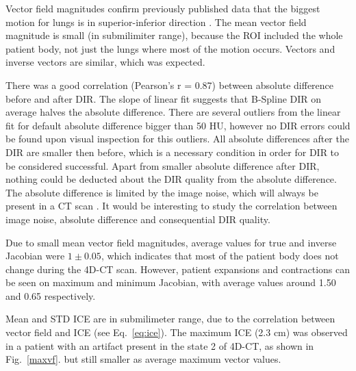 Vector field magnitudes confirm previously published data that the biggest motion for lungs is in superior-inferior direction \cite{Seppenwoolde2002, Britton2007, Liu2007}. The mean vector field magnitude is small (in submilimiter range), 
because the ROI included the whole patient body, not just the lungs where most of the motion occurs. Vectors and inverse vectors are similar, which was expected.

There was a good correlation (Pearson's r = 0.87) between absolute difference before and after DIR. 
The slope of linear fit suggests that B-Spline DIR on average halves the absolute difference. There are several outliers from the
linear fit for default absolute difference bigger than 50 HU, however no DIR errors could be found upon visual inspection for this outliers.
All absolute differences after the DIR are smaller then before, which is a necessary condition in order for DIR to be considered successful. Apart from smaller absolute difference after DIR,
nothing could be deducted about the DIR quality from the absolute difference. The absolute difference is limited by the
image noise, which will always be present in a CT scan \cite{Polacin1992}. It would be interesting to study the 
correlation between image noise, absolute difference and consequential DIR quality.


Due to small mean vector field magnitudes, average values for true and inverse Jacobian were $1\pm0.05$, which indicates that most of the patient body does not change during the 4D-CT
scan. However, patient expansions and contractions can be seen on maximum and minimum Jacobian, with average values around 1.50 and 0.65 respectively. 

Mean and STD ICE are in submilimeter range, due to the correlation between vector field and ICE (see Eq.~\ref{eq:ice}). The maximum ICE (2.3 cm) was observed in a patient with 
an artifact present in the state 2 of 4D-CT, as shown in Fig.~\ref{maxvf}.
but still smaller as average maximum vector values. 

